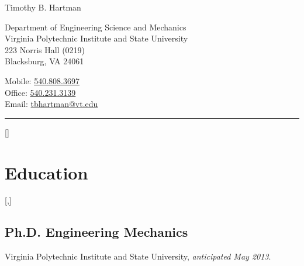 \documentclass[10pt,letterpaper]{article}
\newcommand\name{Timothy B. Hartman}
\def\vpisu{Virginia Polytechnic Institute and State University}
\begin{document}
{\huge \name}

\bigskip

\begin{minipage}[t]{0.5\textwidth}
  Department of Engineering Science and Mechanics \\
  \vpisu \\
  223 Norris Hall (0219) \\
  Blacksburg, VA 24061
\end{minipage}
\begin{minipage}[t]{0.5\textwidth}
  \raggedleft
  Mobile: \href{tel:5408083697}{540.808.3697} \\
  Office: \href{tel:5402313139}{540.231.3139} \\
\newcommand{\email}{tbhartman@vt.edu}
  Email: \href{mailto:\email}{\email} \\
\end{minipage}

\vspace{12pt}

\rule{\textwidth}{1pt}

\titlespacing{\section}{0pt}{\baselineskip}{\baselineskip}{}
\titleformat{\section}[hang]{\Large}{}{1em}{}[]

\section*{Education}

\titleformat{\subsection}[runin]{\bf}{}{0pt}{}[,]

\subsection*{Ph.D. Engineering Mechanics}
\vpisu, \emph{anticipated May 2013}.
\end{document}
